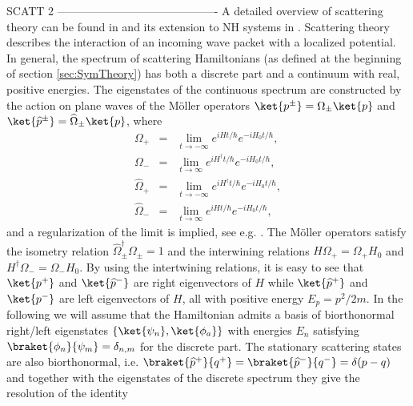 SCATT 2
-------------------------------------------
A detailed overview of scattering theory can be found in \cite{Taylor1972} and its extension to NH systems in \cite{Muga2004}. Scattering theory describes the interaction of an incoming wave packet with a localized potential. In general, the spectrum of scattering Hamiltonians (as defined at the beginning of section \ref{sec:SymTheory}) has both a discrete part and a continuum with real, positive energies.
The eigenstates of the continuous spectrum are constructed by the action on plane waves of the M\"oller operators
$\ket{p^\pm}=\Omega_\pm \ket{p}$ and $\ket{\widehat{p}^\pm}=\widehat{\Omega}_\pm \ket{p}$,
where
%
\begin{eqnarray}
    \Omega_+ &=& \lim_{t \to -\infty}e^{i H t / \hbar}e^{-i H_0 t/ \hbar},\nonumber\\
    \Omega_- &=& \lim_{t \to \infty}e^{i H^\dagger t/ \hbar}e^{-i H_0 t/ \hbar},\nonumber\\
    \widehat{\Omega}_+ &=& \lim_{t \to -\infty}e^{i H^\dagger t/ \hbar}e^{-i H_0 t/ \hbar},\nonumber\\
    \widehat{\Omega}_- &=& \lim_{t \to \infty}e^{i H t/ \hbar}e^{-i H_0 t/ \hbar},
\end{eqnarray}
%
and a regularization of the limit is implied, see e.g. \cite{Muga2004}.
The M\"oller operators satisfy the isometry relation $\widehat{\Omega}_{\pm}^\dagger\Omega_{\pm} = 1$ and the interwining relations $H \Omega_+ = \Omega_+ H_0$ and $H^\dagger \Omega_- = \Omega_- H_0$.
By using the intertwining relations, it is easy to see that $\ket{p^+}$ and $\ket{\widehat{p}^-}$ are right eigenvectors of $H$ while $\ket{\widehat{p}^+}$ and $\ket{p^-}$ are left eigenvectors of $H$, all with positive energy $E_p = p^2/2m$. In the following we will assume that the Hamiltonian admits a basis of biorthonormal
right/left eigenstates $\left\{ \ket{\psi_n} , \ket{\phi_a} \right\}$ with energies $E_n$ satisfying $\braket{\phi_n}{\psi_m} = \delta_{n,m}$ for the discrete part. The stationary scattering states are also biorthonormal, i.e. $\braket{\widehat{p}^+}{q^+} = \braket{\widehat{p}^-}{q^-} = \delta (p-q)$ and together with the eigenstates of the discrete spectrum they give the resolution of the identity
